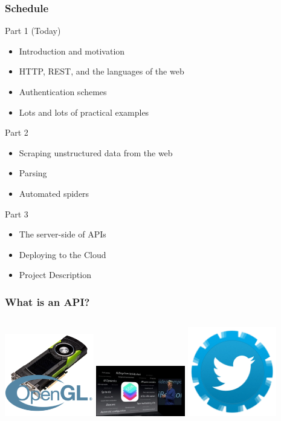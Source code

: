 \documentclass[dvipsnames]{beamer}
\begin{document}
\begin{frame}
  \frametitle{Schedule}
  
  \alert{Part 1 (Today)}
  \begin{itemize}
    \item Introduction and motivation
    \item HTTP, REST, and the languages of the web
    \item Authentication schemes
    \item Lots and lots of practical examples
  \end{itemize}

  Part 2
  \begin{itemize}
    \item Scraping unstructured data from the web
    \item Parsing 
    \item Automated spiders
  \end{itemize}

  Part 3
  \begin{itemize}
    \item The server-side of APIs
    \item Deploying to the Cloud
    \item Project Description
  \end{itemize}
\end{frame}


\begin{frame}
  \frametitle{What is an API?}
  \begin{columns}
    \includegraphics[width=110pt]{img/opengl.png}
    \pause
    \includegraphics[width=110pt]{img/ios.jpg}
    \pause
    \includegraphics[width=110pt]{img/twitter.png}
  \end{columns}
\end{frame}
\end{document}

